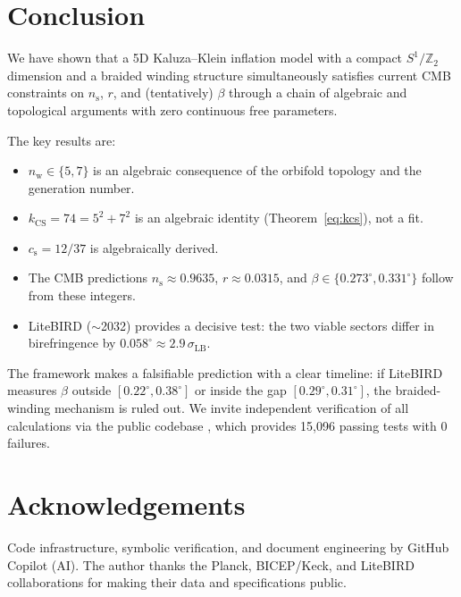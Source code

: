 \documentclass[12pt,a4paper]{article}
\newcommand{\nw}{n_{\mathrm{w}}}
\newcommand{\kcs}{k_{\mathrm{CS}}}
\newcommand{\cs}{c_{\mathrm{s}}}
\newcommand{\ns}{n_{\mathrm{s}}}
\begin{document}
\section{Conclusion}
\label{sec:conclusion}

We have shown that a 5D Kaluza--Klein inflation model with a compact
$S^1/\mathbb{Z}_2$ dimension and a braided winding structure simultaneously
satisfies current CMB constraints on $\ns$, $r$, and (tentatively) $\beta$
through a chain of algebraic and topological arguments with zero continuous
free parameters.

The key results are:
\begin{itemize}
  \item $\nw\in\{5,7\}$ is an algebraic consequence of the orbifold topology
        and the generation number.
  \item $\kcs=74=5^2+7^2$ is an algebraic identity (Theorem~\ref{eq:kcs}),
        not a fit.
  \item $\cs=12/37$ is algebraically derived.
  \item The CMB predictions $\ns\approx 0.9635$, $r\approx 0.0315$, and
        $\beta\in\{0.273^\circ, 0.331^\circ\}$ follow from these integers.
  \item LiteBIRD ($\sim$2032) provides a decisive test: the two viable sectors
        differ in birefringence by $0.058^\circ\approx 2.9\,\sigma_{\mathrm{LB}}$.
\end{itemize}

The framework makes a falsifiable prediction with a clear timeline: if
LiteBIRD measures $\beta$ outside $[0.22^\circ, 0.38^\circ]$ or inside the
gap $[0.29^\circ, 0.31^\circ]$, the braided-winding mechanism is ruled out.
We invite independent verification of all calculations via the public codebase
\cite{WalkerPearson2026}, which provides 15,096 passing tests with 0 failures.

\section*{Acknowledgements}

Code infrastructure, symbolic verification, and document engineering by
GitHub Copilot (AI).  The author thanks the Planck, BICEP/Keck, and LiteBIRD
collaborations for making their data and specifications public.


\end{document}

